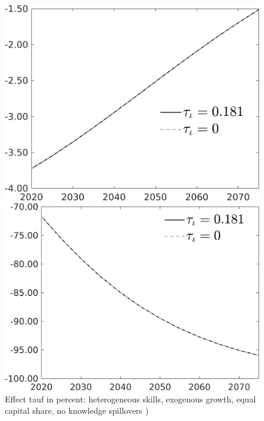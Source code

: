 \documentclass[12pt]{article}
\begin{document}
\begin{figure}[h!!]
	\centering
	\caption{Effect tauf in percent: heterogeneous skills, exogenous growth, equal capital share, no knowledge spillovers )}\label{fig:Leveltauf_nsk0_xgr1_equalcapShare_noknow_notaul2}
	\begin{minipage}[]{0.32\textwidth}
		\includegraphics[width=1\textwidth]{../../codding_model/own_basedOnFried/optimalPol_010922_revision/figures/all_13Sept22/PerdifNoTauf_Equlab_regime0_CompTaul_pg_spillover0_nsk0_xgr1_knspil1_sep1_LFlimit0_emsbase0_countec0_GovRev0_etaa0.79_lgd1.png}
	\end{minipage}		\begin{minipage}[]{0.32\textwidth}
	\includegraphics[width=1\textwidth]{../../codding_model/own_basedOnFried/optimalPol_010922_revision/figures/all_13Sept22/PerdifNoTauf_Equlab_regime0_CompTaul_pgpftf_spillover0_nsk0_xgr1_knspil1_sep1_LFlimit0_emsbase0_countec0_GovRev0_etaa0.79_lgd1.png}

\end{minipage}
\end{figure}
\end{document}
